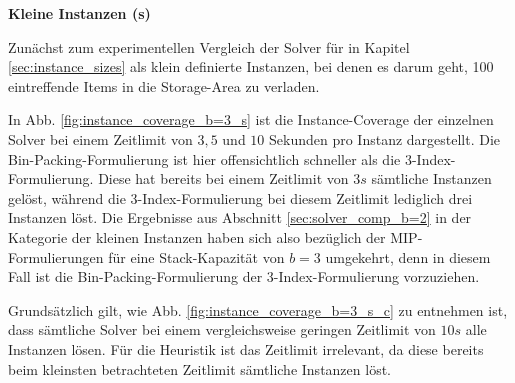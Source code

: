 \textbf{Kleine Instanzen (s)}

Zunächst zum experimentellen Vergleich der Solver für in Kapitel \ref{sec:instance_sizes} als klein definierte
Instanzen, bei denen es darum geht, 100 eintreffende Items in die Storage-Area zu verladen.

In Abb. \ref{fig:instance_coverage_b=3_s} ist die Instance-Coverage der einzelnen Solver bei einem Zeitlimit von $3, 5$
und $10$ Sekunden pro Instanz dargestellt. Die Bin-Packing-Formulierung ist hier offensichtlich schneller als die 3-Index-Formulierung.
Diese hat bereits bei einem Zeitlimit von $3s$ sämtliche Instanzen gelöst, während die 3-Index-Formulierung
bei diesem Zeitlimit lediglich drei Instanzen löst. Die Ergebnisse aus Abschnitt \ref{sec:solver_comp_b=2} in der Kategorie der kleinen
Instanzen haben sich also bezüglich der MIP-Formulierungen für eine Stack-Kapazität von $b = 3$ umgekehrt, denn in diesem Fall
ist die Bin-Packing-Formulierung der 3-Index-Formulierung vorzuziehen.

Grundsätzlich gilt, wie Abb. \ref{fig:instance_coverage_b=3_s_c} zu entnehmen ist, dass sämtliche Solver
bei einem vergleichsweise geringen Zeitlimit von $10s$ alle Instanzen lösen. Für die Heuristik ist das Zeitlimit irrelevant, da
diese bereits beim kleinsten betrachteten Zeitlimit sämtliche Instanzen löst.

